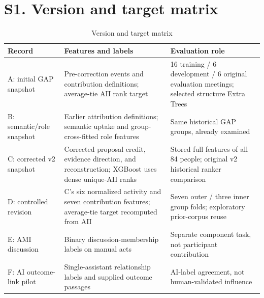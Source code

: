 \documentclass[journal,onecolumn]{IEEEtran}
\begin{document}
\section*{S1. Version and target matrix}
\begin{table}[htbp]
\centering\footnotesize
\caption{Version and target matrix}
\setlength{\tabcolsep}{3pt}
\renewcommand{\arraystretch}{1.15}
\begin{tabular}{p{}p{}p{}}
\toprule
{\raggedright Record\par} & {\raggedright Features and labels\par} & {\raggedright Evaluation role\par} \\
\midrule
{\raggedright A: initial GAP snapshot\par} & {\raggedright Pre-correction events and contribution definitions; average-tie AII rank target\par} & {\raggedright 16 training / 6 development / 6 original evaluation meetings; selected structure Extra Trees\par} \\
{\raggedright B: semantic/role snapshot\par} & {\raggedright Earlier attribution definitions; semantic uptake and group-cross-fitted role features\par} & {\raggedright Same historical GAP groups, already examined\par} \\
{\raggedright C: corrected v2 snapshot\par} & {\raggedright Corrected proposal credit, evidence direction, and reconstruction; XGBoost uses dense unique-AII ranks\par} & {\raggedright Stored full features of all 84 people; original v2 historical ranker comparison\par} \\
{\raggedright D: controlled revision\par} & {\raggedright C's six normalized activity and seven contribution features; average-tie target recomputed from AII\par} & {\raggedright Seven outer / three inner group folds; exploratory prior-corpus reuse\par} \\
{\raggedright E: AMI discussion\par} & {\raggedright Binary discussion-membership labels on manual acts\par} & {\raggedright Separate component task, not participant contribution\par} \\
{\raggedright F: AI outcome-link pilot\par} & {\raggedright Single-assistant relationship labels and supplied outcome passages\par} & {\raggedright AI-label agreement, not human-validated influence\par} \\
\bottomrule
\end{tabular}
\end{table}
\end{document}
